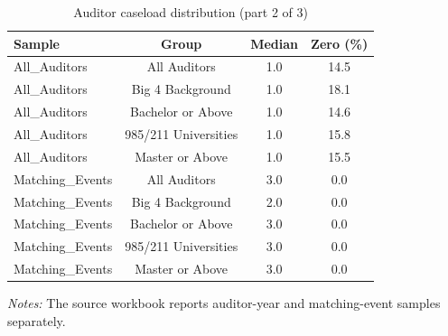 \begin{table}[htbp]
\footnotesize
\centering
\caption{Auditor caseload distribution (part 2 of 3)}
\begin{threeparttable}
\begin{tabular}{p{}ccc}
\toprule
Sample & Group & Median & Zero (\%) \\
\midrule
All\_Auditors & All Auditors & 1.0 & 14.5 \\
All\_Auditors & Big 4 Background & 1.0 & 18.1 \\
All\_Auditors & Bachelor or Above & 1.0 & 14.6 \\
All\_Auditors & 985/211 Universities & 1.0 & 15.8 \\
All\_Auditors & Master or Above & 1.0 & 15.5 \\
Matching\_Events & All Auditors & 3.0 & 0.0 \\
Matching\_Events & Big 4 Background & 2.0 & 0.0 \\
Matching\_Events & Bachelor or Above & 3.0 & 0.0 \\
Matching\_Events & 985/211 Universities & 3.0 & 0.0 \\
Matching\_Events & Master or Above & 3.0 & 0.0 \\
\bottomrule
\end{tabular}
\begin{tablenotes}\footnotesize
\item \raggedright \textit{Notes:} The source workbook reports auditor-year and matching-event samples separately.
\end{tablenotes}
\end{threeparttable}
\end{table}

